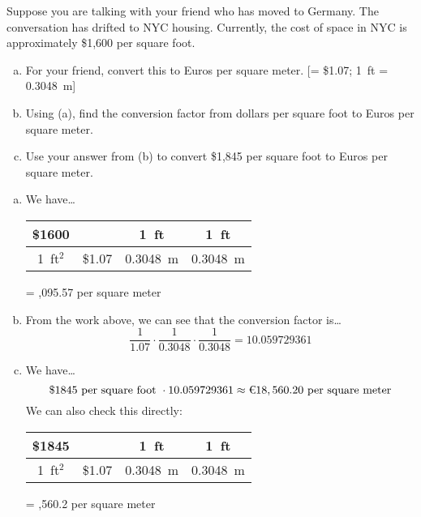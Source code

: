 \documentclass[11pt,letterpaper]{article}
\begin{document}
\newpage



 Suppose you are talking with your friend who has moved to Germany. The conversation has drifted to NYC housing. Currently, the cost of space in NYC is approximately \$1,600 per square foot. 
	\begin{enumerate}[(a)]
	\item For your friend, convert this to Euros per square meter. [= \$1.07; 1~ft = 0.3048~m]
	\item Using (a), find the conversion factor from dollars per square foot to Euros per square meter. 
	\item Use your answer from (b) to convert \$1,845 per square foot to Euros per square meter. 
	\end{enumerate} \pspace

\sol 
\begin{enumerate}[(a)]
\item We have\dots \par
	\begin{table}[H]
	\centering
	\begin{tabular}{c||c|c|c}
	\$1600	& \texteuro 1	& 1~ft		& 1~ft \\ \hline
	1~ft$^2$   & \$1.07 		& 0.3048~m     & 0.3048~m
	\end{tabular}\;= ,095.57 per square meter
	\end{table} \pspace

\item From the work above, we can see that the conversion factor is\dots
	\[
	\dfrac{1}{1.07} \cdot \dfrac{1}{0.3048} \cdot \dfrac{1}{0.3048}= 10.059729361
	\] \pspace

\item We have\dots 
	\[
	\$1845 \text{ per square foot } \cdot 10.059729361 \approx \text{\texteuro }18,560.20 \text{ per square meter}
	\] \pspace
We can also check this directly: \par \pspace
	\begin{table}[H]
	\centering
	\begin{tabular}{c||c|c|c}
	\$1845	& \texteuro 1	& 1~ft		& 1~ft \\ \hline
	1~ft$^2$   & \$1.07 		& 0.3048~m     & 0.3048~m
	\end{tabular}\;= ,560.2 per square meter
	\end{table} \pspace
\end{enumerate}
\end{document}
